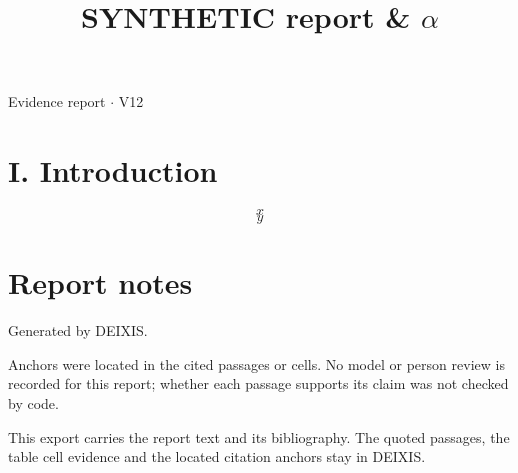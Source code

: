 \documentclass[journal]{IEEEtran}
\begin{document}
\title{SYNTHETIC report \& \ensuremath{\alpha}}

\maketitle

\noindent Evidence report \ensuremath{\cdot} V12

\section*{I. Introduction}

\begin{equation}
\label{eq:EQ1}
x
\end{equation}
\cite{Synth26}
\begin{equation*}
y
\end{equation*}
\cite{Synth26}

\section*{Report notes}

Generated by DEIXIS.

Anchors were located in the cited passages or cells. No model or person review is recorded for this report; whether each passage supports its claim was not checked by code.

This export carries the report text and its bibliography. The quoted passages, the table cell evidence and the located citation anchors stay in DEIXIS.




\end{document}
